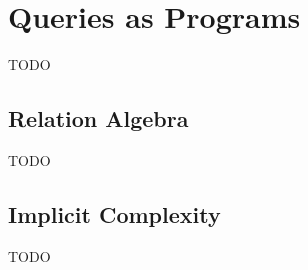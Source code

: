 \section{Queries as Programs}\label{sec:query-prog}
TODO

\subsection{Relation Algebra}\label{sec:relation-algebra}
TODO

\subsection{Implicit Complexity}\label{sec:implicit-complexity}
TODO
